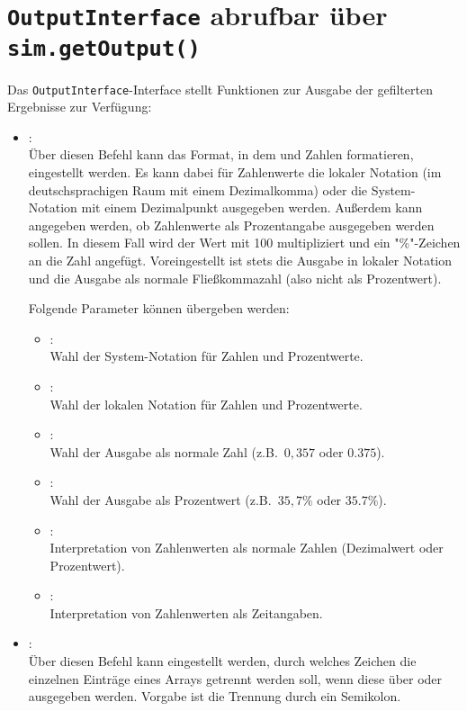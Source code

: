 \chapter{\texttt{OutputInterface} abrufbar über \texttt{sim.getOutput()}}

Das \texttt{OutputInterface}-Interface stellt Funktionen zur Ausgabe der gefilterten Ergebnisse zur Verfügung:

\begin{itemize}

\item
{}:\\
Über diesen Befehl kann das Format, in dem  und 
Zahlen formatieren, eingestellt werden. Es kann dabei für Zahlenwerte die lokaler Notation (im deutschsprachigen
Raum mit einem Dezimalkomma) oder die System-Notation mit einem Dezimalpunkt ausgegeben werden. Außerdem
kann angegeben werden, ob Zahlenwerte als Prozentangabe ausgegeben werden sollen. In diesem Fall wird
der Wert mit 100 multipliziert und ein "\%"-Zeichen an die Zahl angefügt. Voreingestellt ist stets die
Ausgabe in lokaler Notation und die Ausgabe als normale Fließkommazahl (also nicht als Prozentwert).

Folgende Parameter können  übergeben werden:	
\begin{itemize}
\item
{}:\\
Wahl der System-Notation für Zahlen und Prozentwerte.
\item
{}:\\
Wahl der lokalen Notation für Zahlen und Prozentwerte.
\item
{}:\\
Wahl der Ausgabe als normale Zahl (z.B.\ $0{,}357$ oder $0.375$).
\item
{}:\\
Wahl der Ausgabe als Prozentwert (z.B.\ $35,7\%$ oder $35.7\%$).
\item
{}:\\
Interpretation von Zahlenwerten als normale Zahlen (Dezimalwert oder Prozentwert).
\item
{}:\\
Interpretation von Zahlenwerten als Zeitangaben.

\end{itemize}

\item
{}:\\
Über diesen Befehl kann eingestellt werden, durch welches Zeichen die einzelnen Einträge
eines Arrays getrennt werden soll, wenn diese über  oder
 ausgegeben werden.
Vorgabe ist die Trennung durch ein Semikolon.


\end{itemize}
